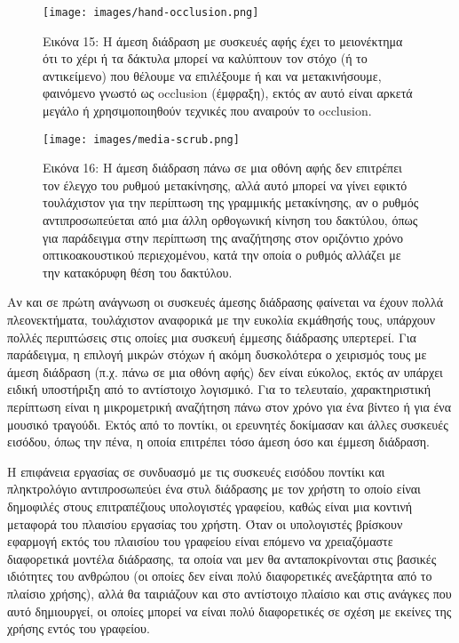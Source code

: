 \documentclass[
]{article}
\begin{document}
\leavevmode{}%
\begin{figure}
\hypertarget{fig:hand-occlusion}{%
\centering
\texttt{[image: images/hand-occlusion.png]}
\caption{Εικόνα 15: Η άμεση διάδραση με συσκευές αφής έχει το
μειονέκτημα ότι το χέρι ή τα δάκτυλα μπορεί να καλύπτουν τον στόχο (ή το
αντικείμενο) που θέλουμε να επιλέξουμε ή και να μετακινήσουμε, φαινόμενο
γνωστό ως occlusion (έμφραξη), εκτός αν αυτό είναι αρκετά μεγάλο ή
χρησιμοποιηθούν τεχνικές που αναιρούν το
occlusion.}\label{fig:hand-occlusion}
}
\end{figure}

\leavevmode{}%
\begin{figure}
\hypertarget{fig:media-scrub}{%
\centering
\texttt{[image: images/media-scrub.png]}
\caption{Εικόνα 16: Η άμεση διάδραση πάνω σε μια οθόνη αφής δεν
επιτρέπει τον έλεγχο του ρυθμού μετακίνησης, αλλά αυτό μπορεί να γίνει
εφικτό τουλάχιστον για την περίπτωση της γραμμικής μετακίνησης, αν ο
ρυθμός αντιπροσωπεύεται από μια άλλη ορθογωνική κίνηση του δακτύλου,
όπως για παράδειγμα στην περίπτωση της αναζήτησης στον οριζόντιο χρόνο
οπτικοακουστικού περιεχομένου, κατά την οποία ο ρυθμός αλλάζει με την
κατακόρυφη θέση του δακτύλου.}\label{fig:media-scrub}
}
\end{figure}

Αν και σε πρώτη ανάγνωση οι συσκευές άμεσης διάδρασης φαίνεται να έχουν
πολλά πλεονεκτήματα, τουλάχιστον αναφορικά με την ευκολία εκμάθησής
τους, υπάρχουν πολλές περιπτώσεις στις οποίες μια συσκευή έμμεσης
διάδρασης υπερτερεί. Για παράδειγμα, η επιλογή μικρών στόχων ή ακόμη
δυσκολότερα ο χειρισμός τους με άμεση διάδραση (π.χ. πάνω σε μια οθόνη
αφής) δεν είναι εύκολος, εκτός αν υπάρχει ειδική υποστήριξη από το
αντίστοιχο λογισμικό. Για το τελευταίο, χαρακτηριστική περίπτωση είναι η
μικρομετρική αναζήτηση πάνω στον χρόνο για ένα βίντεο ή για ένα μουσικό
τραγούδι. Εκτός από το ποντίκι, οι ερευνητές δοκίμασαν και άλλες
συσκευές εισόδου, όπως την πένα, η οποία επιτρέπει τόσο άμεση όσο και
έμμεση διάδραση.

Η επιφάνεια εργασίας σε συνδυασμό με τις συσκευές εισόδου ποντίκι και
πληκτρολόγιο αντιπροσωπεύει ένα στυλ διάδρασης με τον χρήστη το οποίο
είναι δημοφιλές στους επιτραπέζιους υπολογιστές γραφείου, καθώς είναι
μια κοντινή μεταφορά του πλαισίου εργασίας του χρήστη. Όταν οι
υπολογιστές βρίσκουν εφαρμογή εκτός του πλαισίου του γραφείου είναι
επόμενο να χρειαζόμαστε διαφορετικά μοντέλα διάδρασης, τα οποία ναι μεν
θα ανταποκρίνονται στις βασικές ιδιότητες του ανθρώπου (οι οποίες δεν
είναι πολύ διαφορετικές ανεξάρτητα από το πλαίσιο χρήσης), αλλά θα
ταιριάζουν και στο αντίστοιχο πλαίσιο και στις ανάγκες που αυτό
δημιουργεί, οι οποίες μπορεί να είναι πολύ διαφορετικές σε σχέση με
εκείνες της χρήσης εντός του γραφείου.
\end{document}
